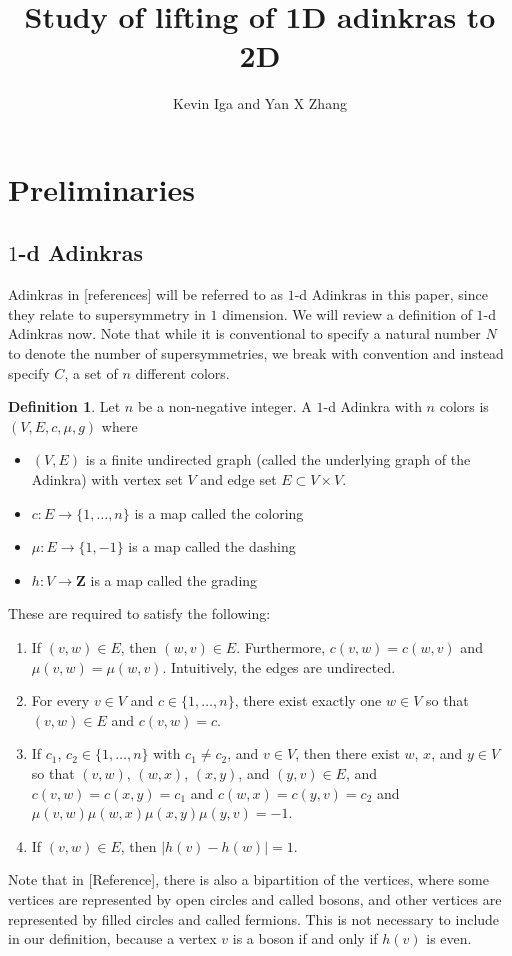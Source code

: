 \documentclass[12pt,twoside,singlespace]{article}
\title{Study of lifting of 1D adinkras to 2D}
\author{Kevin Iga and Yan X Zhang}
\numberwithin{equation}{section}
\theoremstyle{definition}
\newtheorem{definition}[equation]{Definition}
\newcommand{\ZZ}{\mathbf{Z}}
\begin{document}
\pagestyle{plain}

\maketitle

\section{Preliminaries}

\subsection{$1$-d Adinkras}
Adinkras in [references] will be referred to as $1$-d Adinkras in this paper, since they relate to supersymmetry in $1$ dimension.  We will review a definition of $1$-d Adinkras now.  Note that while it is conventional to specify a natural number $N$ to denote the number of supersymmetries, we break with convention and instead specify $C$, a set of $n$ different colors.

\begin{definition}
Let $n$ be a non-negative integer.  A $1$-d Adinkra with $n$ colors is $(V,E,c,\mu,g)$ where
\begin{itemize}
\item $(V,E)$ is a finite undirected graph (called the underlying graph of the Adinkra) with vertex set $V$ and edge set $E\subset V\times V$.
\item $c:E\to \{1,\ldots,n\}$ is a map called the coloring
\item $\mu:E\to \{1,-1\}$ is a map called the dashing
\item $h:V\to\ZZ$ is a map called the grading
\end{itemize}

These are required to satisfy the following:
\begin{enumerate}
\item If $(v,w)\in E$, then $(w,v)\in E$.  Furthermore, $c(v,w)=c(w,v)$ and $\mu(v,w)=\mu(w,v)$.  Intuitively, the edges are undirected.
\item For every $v\in V$ and $c\in \{1,\ldots,n\}$, there exist exactly one $w\in V$ so that $(v,w)\in E$ and $c(v,w)=c$.
\item If $c_1$, $c_2\in \{1,\ldots,n\}$ with $c_1\not=c_2$, and $v\in V$, then there exist $w$, $x$, and $y\in V$ so that $(v,w)$, $(w,x)$, $(x,y)$, and $(y,v)\in E$, and $c(v,w)=c(x,y)=c_1$ and $c(w,x)=c(y,v)=c_2$ and $\mu(v,w)\mu(w,x)\mu(x,y)\mu(y,v)=-1$.
\item If $(v,w)\in E$, then $|h(v)-h(w)|=1$.
\end{enumerate}
\end{definition}
Note that in [Reference], there is also a bipartition of the vertices, where some vertices are represented by open circles and called bosons, and other vertices are represented by filled circles and called fermions.  This is not necessary to include in our definition, because a vertex $v$ is a boson if and only if $h(v)$ is even.
\end{document}

